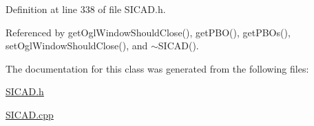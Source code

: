 Definition at line 338 of file S\+I\+C\+A\+D.\+h.



Referenced by get\+Ogl\+Window\+Should\+Close(), get\+P\+B\+O(), get\+P\+B\+Os(), set\+Ogl\+Window\+Should\+Close(), and $\sim$\+S\+I\+C\+A\+D().



The documentation for this class was generated from the following files\+:\begin{DoxyCompactItemize}
\item 
\mbox{\hyperlink{SICAD_8h}{S\+I\+C\+A\+D.\+h}}\item 
\mbox{\hyperlink{SICAD_8cpp}{S\+I\+C\+A\+D.\+cpp}}\end{DoxyCompactItemize}

